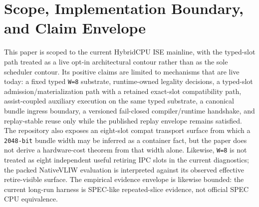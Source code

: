 \documentclass[twocolumn]{article}
\begin{document}
\section{Scope, Implementation Boundary, and Claim Envelope}

This paper is scoped to the current HybridCPU ISE mainline, with the typed-slot path treated as a live opt-in architectural contour rather than as the sole scheduler contour. Its positive claims are limited to mechanisms that are live today: a fixed typed \texttt{W=8} substrate, runtime-owned legality decisions, a typed-slot admission/materialization path with a retained exact-slot compatibility path, assist-coupled auxiliary execution on the same typed substrate, a canonical bundle ingress boundary, a versioned fail-closed compiler/runtime handshake, and replay-stable reuse only while the published replay envelope remains satisfied. The repository also exposes an eight-slot compat transport surface from which a \texttt{2048-bit} bundle width may be inferred as a container fact, but the paper does not derive a hardware-cost theorem from that width alone. Likewise, \texttt{W=8} is not treated as eight independent useful retiring IPC slots in the current diagnostics; the packed NativeVLIW evaluation is interpreted against its observed effective retire-visible surface. The empirical evidence envelope is likewise bounded: the current long-run harness is SPEC-like repeated-slice evidence, not official SPEC CPU equivalence.
\end{document}
